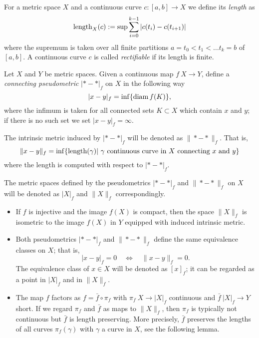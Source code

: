 \documentclass[a4paper,10pt]{amsart}
\begin{document}
For a metric space $X$ and a continuous curve $c:[a,b]\to X$ we define its {\em length} as
\[\mathop{\rm length}\nolimits_X(c):=\sup\sum_{i=0}^{k-1} |c(t_i)-c(t_{i+1})|\]
where the supremum is taken over all finite partitions ${a=t_0<t_1<\ldots t_k=b}$ of $[a,b]$. 
A continuous curve $c$ is called {\em rectifiable} if its length is finite.







Let $X$ and $Y$ be metric spaces.
Given a continuous map $f\:X\to Y$,
define a \emph{connecting pseudometric} $|{*}-{*}|_f$ on $X$ in
the following way
\[|x-y|_f=\inf\{\mathop{\rm diam}\nolimits f(K)\},\]
where the infimum is taken for all connected sets $K\subset X$ which contain $x$ and $y$;
if there is no such set we set $|x-y|_f=\infty$.

The intrinsic metric induced by $|{*}-{*}|_f$ will be denoted as 
$\|{*}-{*}\|_f$. 
That is, 
\[\|x-y\|_f=\inf\{\length(\gamma)|\ \gamma \text{ continuous curve in } X \text{ connecting } x \text{ and } y\}\]
where the length is computed with respect to $|{*}-{*}|_f$.

The metric spaces defined by the pseudometrics $|{*}-{*}|_f$ 
and $\|{*}-{*}\|_f$ on $X$ will be denoted as $|X|_f$ and $\|X\|_f$ correspondingly.




\begin{itemize}
\item If $f$ is injective and the image $f(X)$ is compact, then 
the space $\|X\|_f$ is isometric to the image $f(X)$ in $Y$ equipped with induced intrinsic metric. 
\item Both pseudometrics $|{*}-{*}|_f$ and  $\|{*}-{*}\|_f$
define the same equivalence classes on $X$;
that is,
\[|x-y|_f=0\quad\iff\quad\|x-y\|_f=0.\]
The equivalence class of $x\in X$ will be denoted as $[x]_f$; 
it can be regarded as a point in  $|X|_f$ and in $\|X\|_f$.
\item The map $f$ factors as $f=\bar f\circ \pi_f$ with $\pi_f\:X\to|X|_f$ continuous and $\bar f\:|X|_f\to Y$ short.
If we regard $\pi_f$ and $\bar f$ as maps to $\|X\|_f$, then $\pi_f$ is typically not continuous but $\bar f$ is length 
preserving. More precisely, $\bar f$ preserves the lengths of all curves $\pi_f(\gamma)$ with $\gamma$ a curve in $X$, see the following lemma.
\end{itemize}
\end{document}

